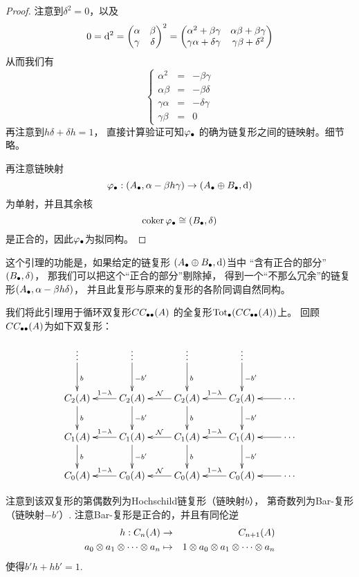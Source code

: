 \begin{proof}
注意到$\delta^2=0$，以及
$$0=\mathrm{d}^2
   =\begin{pmatrix}
       \alpha &\beta\\
       \gamma &\delta
    \end{pmatrix}^2
   =
    \begin{pmatrix}
       \alpha^2+\beta\gamma
      &\alpha\beta+\beta\gamma\\
       \gamma\alpha+\delta\gamma
      &\gamma\beta+\delta^2
    \end{pmatrix}
$$
从而我们有
$$
\left\{\begin{array}{rcl}
\alpha^2&=&-\beta\gamma\\
\alpha\beta&=&-\beta\delta\\
\gamma\alpha&=&-\delta\gamma\\
\gamma\beta&=&0
\end{array}\right.
$$
再注意到$h\delta+\delta h=1$，
直接计算验证可知$\varphi_{\bullet}$
的确为链复形之间的链映射。细节略。

再注意链映射
$$\varphi_{\bullet}:
(A_{\bullet},\alpha-\beta h\gamma)\to
(A_{\bullet}\oplus B_{\bullet},\mathrm{d})$$
为单射，并且其余核
$$\operatorname{coker}\varphi_{\bullet}\cong
(B_{\bullet},\delta)$$
是正合的，因此$\varphi_{\bullet}$为拟同构。
\end{proof}

这个引理的功能是，如果给定的链复形
$(A_{\bullet}\oplus B_{\bullet},\mathrm{d})$当中
“含有正合的部分”$(B_{\bullet},\delta)$，
那我们可以把这个“正合的部分”剔除掉，
得到一个“不那么冗余”的链复形$(A_{\bullet},\alpha-\beta h\delta)$，
并且此复形与原来的复形的各阶同调自然同构。\vs

我们将此引理用于循环双复形$CC_{\bullet\bullet}(A)$
的全复形$\operatorname{Tot}_{\bullet}(CC_{\bullet\bullet}(A))$上。
回顾$CC_{\bullet\bullet}(A)$为如下双复形：

$$\xymatrix{
   \vdots \ar[d]^b
  &\vdots \ar[d]^{-b'}
  &\vdots \ar[d]^b
  &\vdots \ar[d]^{-b'}
  &
\\
   C_2(A) \ar[d]^b
  &C_2(A) \ar[d]^{-b'} \ar[l]_{1-\lmd}
  &C_2(A) \ar[d]^b     \ar[l]_{\mcalN}
  &C_2(A) \ar[d]^{-b'} \ar[l]_{1-\lmd}
  &\cdots              \ar[l]
\\
   C_1(A) \ar[d]^b
  &C_1(A) \ar[d]^{-b'} \ar[l]_{1-\lmd}
  &C_1(A) \ar[d]^b     \ar[l]_{\mcalN}
  &C_1(A) \ar[d]^{-b'} \ar[l]_{1-\lmd}
  &\cdots              \ar[l]
\\
   C_0(A)
  &C_0(A)   \ar[l]_{1-\lmd}
  &C_0(A)   \ar[l]_{\mcalN}
  &C_0(A)   \ar[l]_{1-\lmd}
  &\cdots   \ar[l]
}$$

注意到该双复形的第偶数列为Hochschild链复形（链映射$b$），
第奇数列为Bar-复形（链映射$-b'$）.
注意Bar-复形是正合的，并且有同伦逆
\begin{eqnarray}
h:C_n(A)&\to&C_{n+1}(A)\\
a_0\otimes a_{1}\otimes\cdots\otimes a_{n}&\mapsto&
1\otimes a_0\otimes a_{1}\otimes\cdots\otimes a_{n}
\end{eqnarray}
使得$b'h+hb'=1$.

